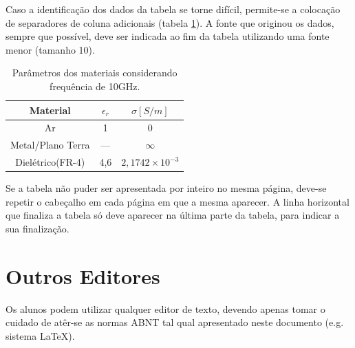 \documentclass[repeatfields,xlists,xpacks,oneside,yearsonly]{ufrgscca}
\begin{document}
\begin{appendix}
Caso a identificação dos dados da tabela se torne difícil, permite-se a
colocação de separadores de coluna adicionais (tabela \ref{tabvert}). A fonte que
originou os dados, sempre que possível, deve ser indicada ao fim da tabela
utilizando uma fonte menor (tamanho 10).

\begin{table}[htb]
  \begin{center}
  \caption{Parâmetros dos materiais considerando frequência de 10GHz.}\label{tabvert}
  \begin{tabular}{c|c|c}
  \hline
  Material		& $\epsilon_r$	& $\sigma[S/m]$\\
  \hline
  Ar			& 1		& 0\\
  Metal/Plano Terra 	& --- 		& $\infty$\\
  Dielétrico(FR-4) 	& 4,6		& $2,1742\times10^{-3}$\\
  \hline
  \end{tabular}
	\end{center}
{}
\end{table}

Se a tabela não puder ser apresentada por inteiro no mesma página, deve-se
repetir o cabeçalho em cada página em que a mesma aparecer. A linha horizontal que
finaliza a tabela só deve aparecer na última parte da tabela, para indicar a
sua finalização.




\chapter{Outros Editores}

Os alunos podem utilizar qualquer editor de texto, devendo apenas tomar o cuidado de atêr-se as normas ABNT tal qual apresentado neste documento (e.g. sistema \LaTeX).

\end{appendix}
\end{document}
